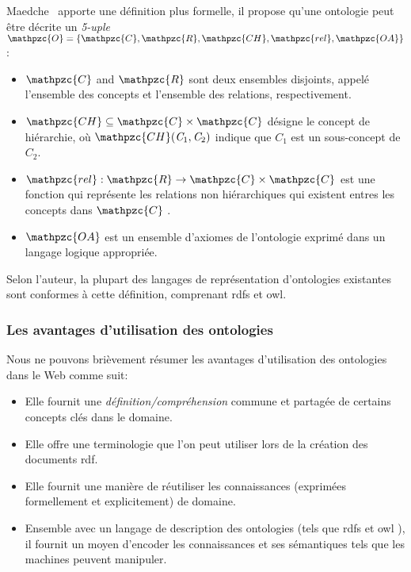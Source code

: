 Maedche~\cite{maedche2002ontology} apporte une définition plus
formelle, il propose qu'une ontologie peut être décrite un
\emph{5-uple}
$\mathpzc{O} = \{\mathpzc{C}, \mathpzc{R}, \mathpzc{CH}, \mathpzc{rel}
, \mathpzc{OA}\}$:

\SpecialItem
\begin{itemize}
\item $\mathpzc{C}$ and $\mathpzc{R}$ sont deux ensembles disjoints,
  appelé l'ensemble des concepts et l'ensemble des relations,
  respectivement.

\item $\mathpzc{CH} \subseteq \mathpzc{C} \times \mathpzc{C}$ désigne
  le concept de hiérarchie, où
  $\mathpzc{CH} (\mathit{C}_1, \mathit{C}_2)$ indique que $C_1$ est un
  sous-concept de $C_2$.

\item $\mathpzc{rel}: \mathpzc{R} \to \mathpzc{C} \times \mathpzc{C}$
  est une fonction qui représente les relations non hiérarchiques qui
  existent entres les concepts dans $\mathpzc{C}$ .

\item $\mathpzc{OA}$ est un ensemble d'axiomes de l'ontologie exprimé
  dans un langage logique appropriée.\medskip
\end{itemize}
\enddescription

Selon l'auteur, la plupart des langages de représentation d'ontologies
existantes sont conformes à cette définition, comprenant
\acrshort{rdfs} et \acrshort{owl}.

\subsubsection{Les avantages d'utilisation des ontologies}
\label{sec:sec:semantic-web-owl-ontolgies--benefits}

Nous ne pouvons brièvement résumer les avantages d'utilisation des
ontologies dans le Web comme suit:

\SpecialItem
\begin{itemize}
\item Elle fournit une \emph{définition/compréhension} commune et
  partagée de certains concepts clés dans le domaine.

\item Elle offre une terminologie que l'on peut utiliser lors de la
  création des documents \acrshort{rdf}.

\item Elle fournit une manière de réutiliser les connaissances
  (exprimées formellement et explicitement) de domaine.

\item Ensemble avec un langage de description des ontologies (tels que
  \acrshort{rdfs} et \acrshort{owl} ), il fournit un moyen d'encoder
  les connaissances et ses sémantiques tels que les machines peuvent
  manipuler.
\end{itemize}
\enddescription

